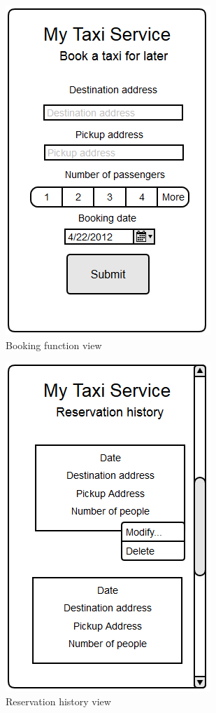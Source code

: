 \begin{figure}
\centering
\includegraphics{tex-images/ui-passenger-book}
\caption{Booking function view}
\end{figure}

\begin{figure}
\centering
\includegraphics{tex-images/ui-passenger-history}
\caption{Reservation history view}
\end{figure}



